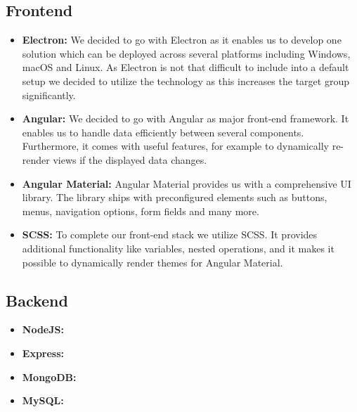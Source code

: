 \subsection{Frontend}\label{subsec:frontend}

\begin{itemize}
    \item \textbf{Electron:} We decided to go with Electron as it enables us to develop one solution which can be
        deployed across several platforms including Windows, macOS and Linux. As Electron is not that difficult to
        include into a default setup we decided to utilize the technology as this increases the target group
        significantly.
    \item \textbf{Angular:} We decided to go with Angular as major front-end framework. It enables us to handle data
        efficiently between several components. Furthermore, it comes with useful features, for example to dynamically
        re-render views if the displayed data changes.
    \item \textbf{Angular Material:} Angular Material provides us with a comprehensive UI library. The library ships
        with preconfigured elements such as buttons, menus, navigation options, form fields and many more.
    \item \textbf{SCSS:} To complete our front-end stack we utilize SCSS. It provides additional functionality like
        variables, nested operations, and it makes it possible to dynamically render themes for Angular Material.
\end{itemize}

\subsection{Backend}\label{subsec:backend}

\begin{itemize}
    \item \textbf{NodeJS:} %
    \item \textbf{Express:} %
    \item \textbf{MongoDB:} %
    \item \textbf{MySQL:} %
\end{itemize}
